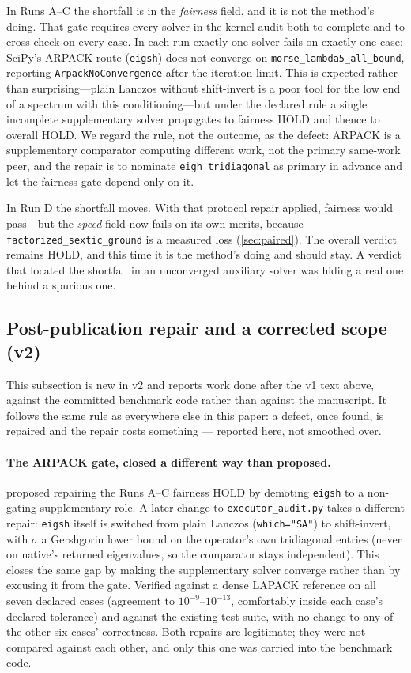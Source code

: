 \documentclass[twocolumn,10pt,a4paper]{article}
\theoremstyle{plain}
\theoremstyle{definition}
\newcommand{\HOLD}{\textsf{HOLD}}
\begin{document}
In Runs A--C the shortfall is in the \emph{fairness} field, and it is not the
method's doing. That gate requires every solver in the kernel audit both to
complete and to cross-check on every case. In each run exactly one solver fails
on exactly one case: SciPy's ARPACK route (\texttt{eigsh}) does not converge on
\texttt{morse\_lambda5\_all\_bound}, reporting \texttt{ArpackNoConvergence}
after the iteration limit. This is expected rather than surprising---plain
Lanczos without shift-invert is a poor tool for the low end of a spectrum with
this conditioning---but under the declared rule a single incomplete
supplementary solver propagates to fairness \HOLD{} and thence to overall
\HOLD{}. We regard the rule, not the outcome, as the defect: ARPACK is a
supplementary comparator computing different work, not the primary same-work
peer, and the repair is to nominate \texttt{eigh\_tridiagonal} as primary in
advance and let the fairness gate depend only on it.

In Run D the shortfall moves. With that protocol repair applied, fairness would
pass---but the \emph{speed} field now fails on its own merits, because
\texttt{factorized\_sextic\_ground} is a measured loss
(\cref{sec:paired}). The overall verdict remains \HOLD{}, and this time it is
the method's doing and should stay. A verdict that located the shortfall in an
unconverged auxiliary solver was hiding a real one behind a spurious one.

\subsection{Post-publication repair and a corrected scope (v2)}
\label{sec:v2repair}

This subsection is new in v2 and reports work done after the v1 text above,
against the committed benchmark code rather than against the manuscript. It
follows the same rule as everywhere else in this paper: a defect, once
found, is repaired and the repair costs something --- reported here, not
smoothed over.

\paragraph{The ARPACK gate, closed a different way than proposed.}
 proposed repairing the Runs A--C fairness \HOLD{} by
demoting \texttt{eigsh} to a non-gating supplementary role. A later change to
\texttt{executor\_audit.py} takes a different repair: \texttt{eigsh} itself is
switched from plain Lanczos (\texttt{which="SA"}) to shift-invert, with
$\sigma$ a Gershgorin lower bound on the operator's own tridiagonal entries
(never on native's returned eigenvalues, so the comparator stays
independent). This closes the same gap by making the supplementary solver
converge rather than by excusing it from the gate. Verified against a dense
LAPACK reference on all seven declared cases (agreement to
$10^{-9}$--$10^{-13}$, comfortably inside each case's declared tolerance) and
against the existing test suite, with no change to any of the other six
cases' correctness. Both repairs are legitimate; they were not compared
against each other, and only this one was carried into the benchmark code.
\end{document}
